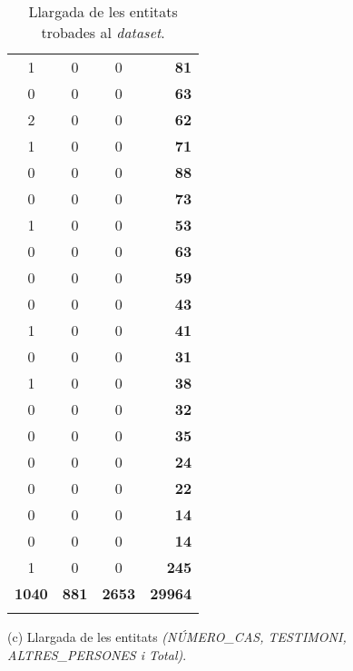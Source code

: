 \begin{table}[H]
\begin{tabular}{ccc|r|}
    1 & 0 & 0 & \textbf{81} \\
    0 & 0 & 0 & \textbf{63} \\
    2 & 0 & 0 & \textbf{62} \\
    1 & 0 & 0 & \textbf{71} \\
    0 & 0 & 0 & \textbf{88} \\
    0 & 0 & 0 & \textbf{73} \\
    1 & 0 & 0 & \textbf{53} \\
    0 & 0 & 0 & \textbf{63} \\
    0 & 0 & 0 & \textbf{59} \\
    0 & 0 & 0 & \textbf{43} \\
    1 & 0 & 0 & \textbf{41} \\
    0 & 0 & 0 & \textbf{31} \\
    1 & 0 & 0 & \textbf{38} \\
    0 & 0 & 0 & \textbf{32} \\
    0 & 0 & 0 & \textbf{35} \\
    0 & 0 & 0 & \textbf{24} \\
    0 & 0 & 0 & \textbf{22} \\
    0 & 0 & 0 & \textbf{14} \\
    0 & 0 & 0 & \textbf{14} \\
    1 & 0 & 0 & \textbf{245} \\
    \hline
    \textbf{1040} & \textbf{881} & \textbf{2653} & \textbf{29964}\\
    \Xhline{2\arrayrulewidth}
    \end{tabular}
    \captionsetup{font=small}
    \caption*{(c) Llargada de les entitats \textit{(NÚMERO\_CAS, TESTIMONI, ALTRES\_PERSONES i Total)}.}
    \captionsetup{font=normalsize}
    \caption{Llargada de les entitats trobades al \textit{dataset}.}
    \label{tab:llargada_entitats}
\end{table}


  